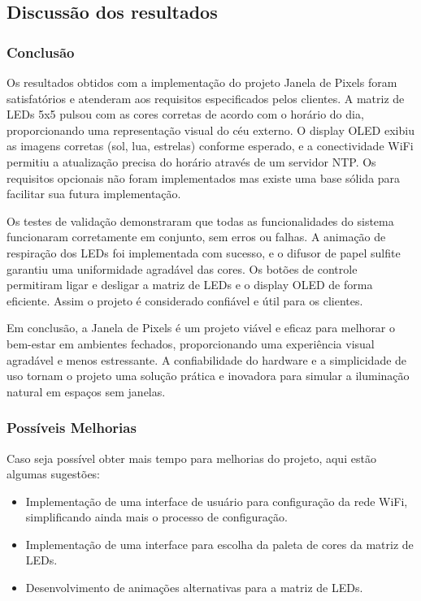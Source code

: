 \documentclass[12pt]{article}
\begin{document}
\subsection{Discussão dos resultados}
\subsubsection{Conclusão}
Os resultados obtidos com a implementação do projeto Janela de Pixels foram satisfatórios e atenderam aos requisitos especificados pelos clientes. A matriz de LEDs 5x5 pulsou com as cores corretas de acordo com o horário do dia, proporcionando uma representação visual do céu externo. O display OLED exibiu as imagens corretas (sol, lua, estrelas) conforme esperado, e a conectividade WiFi permitiu a atualização precisa do horário através de um servidor NTP. Os requisitos opcionais não foram implementados mas existe uma base sólida para facilitar sua futura implementação.

Os testes de validação demonstraram que todas as funcionalidades do sistema funcionaram corretamente em conjunto, sem erros ou falhas. A animação de respiração dos LEDs foi implementada com sucesso, e o difusor de papel sulfite garantiu uma uniformidade agradável das cores. Os botões de controle permitiram ligar e desligar a matriz de LEDs e o display OLED de forma eficiente. Assim o projeto é considerado confiável e útil para os clientes.

Em conclusão, a Janela de Pixels é um projeto viável e eficaz para melhorar o bem-estar em ambientes fechados, proporcionando uma experiência visual agradável e menos estressante. A confiabilidade do hardware e a simplicidade de uso tornam o projeto uma solução prática e inovadora para simular a iluminação natural em espaços sem janelas.

\subsubsection{Possíveis Melhorias}
Caso seja possível obter mais tempo para melhorias do projeto, aqui estão algumas sugestões:
\begin{itemize}
    \item Implementação de uma interface de usuário para configuração da rede WiFi, simplificando ainda mais o processo de configuração.
    \item Implementação de uma interface para escolha da paleta de cores da matriz de LEDs.
    \item Desenvolvimento de animações alternativas para a matriz de LEDs.
\end{itemize}
\end{document}
